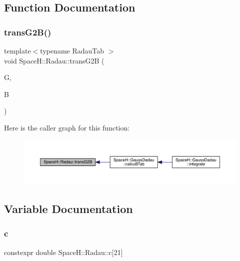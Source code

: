 \subsection{Function Documentation}
\mbox{\label{namespace_space_h_1_1_radau_ac20bc7d0c1a878276e64f05506b875e5}} 
\subsubsection{\texorpdfstring{trans\+G2\+B()}{transG2B()}}
{\footnotesize\ttfamily template$<$typename Radau\+Tab $>$ \\
void Space\+H\+::\+Radau\+::trans\+G2B (\begin{DoxyParamCaption}\item[{const Radau\+Tab \&}]{G,  }\item[{Radau\+Tab \&}]{B }\end{DoxyParamCaption})}

Here is the caller graph for this function\+:
\nopagebreak
\begin{figure}[H]
\begin{center}
\leavevmode
\includegraphics[width=350pt]{namespace_space_h_1_1_radau_ac20bc7d0c1a878276e64f05506b875e5_icgraph}
\end{center}
\end{figure}


\subsection{Variable Documentation}
\mbox{\label{namespace_space_h_1_1_radau_a8ef5a0de3fa20bfed420d08e5b85dcd9}} 
\subsubsection{\texorpdfstring{c}{c}}
{\footnotesize\ttfamily constexpr double Space\+H\+::\+Radau\+::c\mbox{[}21\mbox{]}}

